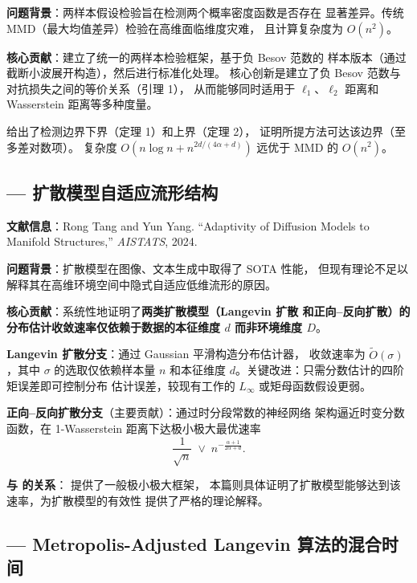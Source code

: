 \documentclass[12pt]{amsbook}
\theoremstyle{plain}
\begin{document}
\textbf{问题背景}：两样本假设检验旨在检测两个概率密度函数是否存在
显著差异。传统 MMD（最大均值差异）检验在高维面临维度灾难，
且计算复杂度为 $O(n^2)$。

\textbf{核心贡献}：建立了统一的两样本检验框架，基于负 Besov 范数的
样本版本（通过截断小波展开构造），然后进行标准化处理。
核心创新是建立了负 Besov 范数与对抗损失之间的等价关系（引理 1），
从而能够同时适用于 $\ell_1$、$\ell_2$ 距离和 Wasserstein 距离等多种度量。

给出了检测边界下界（定理 1）和上界（定理 2），
证明所提方法可达该边界（至多差对数项）。
复杂度 $O(n\log n + n^{2d/(4\alpha+d)})$ 远优于 MMD 的 $O(n^2)$。

\subsection{\citep{tang2024diffusion} --- 扩散模型自适应流形结构}
\label{sec:tang-aistats2024}

\textbf{文献信息}：Rong Tang and Yun Yang.
``Adaptivity of Diffusion Models to Manifold Structures,''
\textit{AISTATS}, 2024.

\textbf{问题背景}：扩散模型在图像、文本生成中取得了 SOTA 性能，
但现有理论不足以解释其在高维环境空间中隐式自适应低维流形的原因。

\textbf{核心贡献}：系统性地证明了\textbf{两类扩散模型（Langevin 扩散
和正向--反向扩散）的分布估计收敛速率仅依赖于数据的本征维度 $d$
而非环境维度 $D$}。

\textbf{Langevin 扩散分支}：通过 Gaussian 平滑构造分布估计器，
收敛速率为 $\tilde{O}(\sigma)$，其中 $\sigma$ 的选取仅依赖样本量 $n$
和本征维度 $d$。关键改进：只需分数估计的四阶矩误差即可控制分布
估计误差，较现有工作的 $L_\infty$ 或矩母函数假设更弱。

\textbf{正向--反向扩散分支}（主要贡献）：通过时分段常数的神经网络
架构逼近时变分数函数，在 1-Wasserstein 距离下达极小极大最优速率
\[
\frac{1}{\sqrt{n}}
\;\vee\;
n^{-\frac{\alpha+1}{2\alpha+d}}.
\]

\textbf{与 \citep{tang2022minimax} 的关系}：\citep{tang2022minimax} 提供了一般极小极大框架，
本篇则具体证明了扩散模型能够达到该速率，为扩散模型的有效性
提供了严格的理论解释。

\subsection{\citep{tang2024mala} --- Metropolis-Adjusted Langevin 算法的混合时间}
\label{sec:tang-icml2024}
\end{document}

